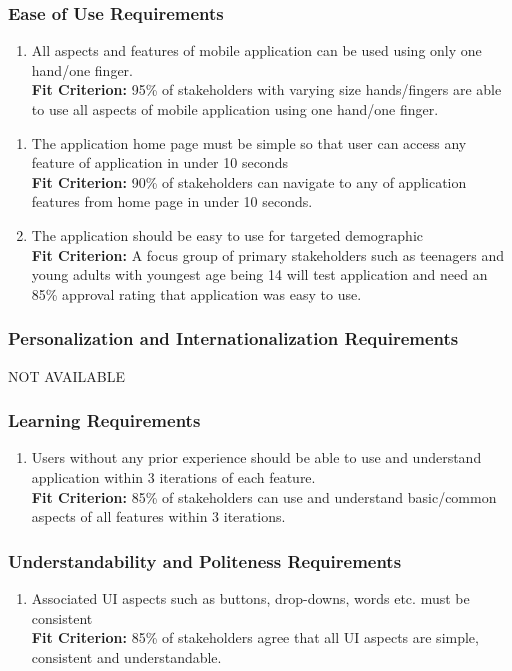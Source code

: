 \documentclass[12pt,letterpaper]{article}
\begin{document}
\subsubsection{Ease of Use Requirements}
\begin{enumerate}[{UH}1.] 
\item All aspects and features of mobile application can be used using only one hand/one finger.\\
{\textbf{Fit Criterion:} 95\% of stakeholders with varying size hands/fingers are able to use all aspects of mobile application using one hand/one finger.}
\end{enumerate}
\begin{enumerate}[resume*]  
\item The application home page must be simple so that user can access any feature of application in under 10 seconds\\
{\textbf{Fit Criterion:} 90\% of stakeholders can navigate to any of application features from home page in under 10 seconds. }
\item The application should be easy to use for targeted demographic\\
{\textbf{Fit Criterion:} A focus group of primary stakeholders such as teenagers and young adults with youngest age being 14 will test application and need an 85\% approval rating that application was easy to use. }
\end{enumerate}

\subsubsection{Personalization and Internationalization Requirements}
\noindent NOT AVAILABLE

\subsubsection{Learning Requirements}
\begin{enumerate}[resume*] 
\item Users without any prior experience should be able to use and understand application within 3 iterations of each feature.\\
{\textbf{Fit Criterion:} 85\% of stakeholders can use and understand basic/common aspects of all features within 3 iterations.}
\end{enumerate}

\subsubsection{Understandability and Politeness Requirements}
\begin{enumerate}[resume*] 
\item Associated UI aspects such as buttons, drop-downs, words etc. must be consistent\\
{\textbf{Fit Criterion:} 85\% of stakeholders agree that all UI aspects are simple, consistent and understandable.}
\end{enumerate}
\end{document}

